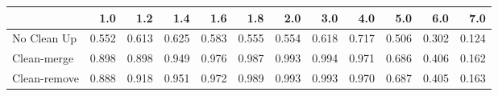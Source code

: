 \begin{tabular}{lrrrrrrrrrrr}
\toprule
{} &   1.0 &   1.2 &   1.4 &   1.6 &   1.8 &   2.0 &   3.0 &   4.0 &   5.0 &   6.0 &   7.0 \\
\midrule
No Clean Up  & 0.552 & 0.613 & 0.625 & 0.583 & 0.555 & 0.554 & 0.618 & 0.717 & 0.506 & 0.302 & 0.124 \\
Clean-merge  & 0.898 & 0.898 & 0.949 & 0.976 & 0.987 & 0.993 & 0.994 & 0.971 & 0.686 & 0.406 & 0.162 \\
Clean-remove & 0.888 & 0.918 & 0.951 & 0.972 & 0.989 & 0.993 & 0.993 & 0.970 & 0.687 & 0.405 & 0.163 \\
\bottomrule
\end{tabular}
